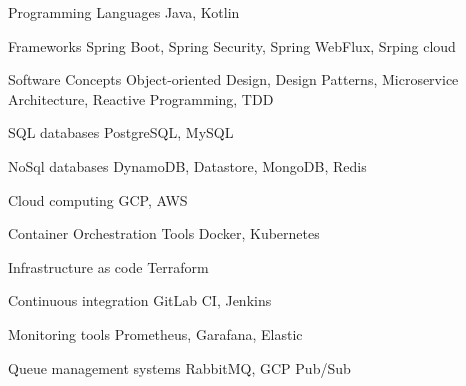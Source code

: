 
\begin{cvskills}

  \cvskill
    {Programming Languages} %
    {Java, Kotlin} %

  \cvskill
    {Frameworks} %
    {Spring Boot, Spring Security, Spring WebFlux, Srping cloud} %

  \cvskill
    {Software Concepts} %
    {Object-oriented Design, Design Patterns, Microservice Architecture, Reactive Programming, TDD} %

  \cvskill
    {SQL databases} %
    {PostgreSQL, MySQL} %

  \cvskill
    {NoSql databases} %
    {DynamoDB, Datastore, MongoDB, Redis} %

  \cvskill
    {Cloud computing} %
    {GCP, AWS} %

  \cvskill
    {Container Orchestration Tools} %
    {Docker, Kubernetes} %

  \cvskill
    {Infrastructure as code} %
    {Terraform} %

  \cvskill
    {Continuous integration} %
    {GitLab CI, Jenkins} %

  \cvskill
    {Monitoring tools} %
    {Prometheus, Garafana, Elastic} %

  \cvskill
    {Queue management systems} %
    {RabbitMQ, GCP Pub/Sub} %


\end{cvskills}
